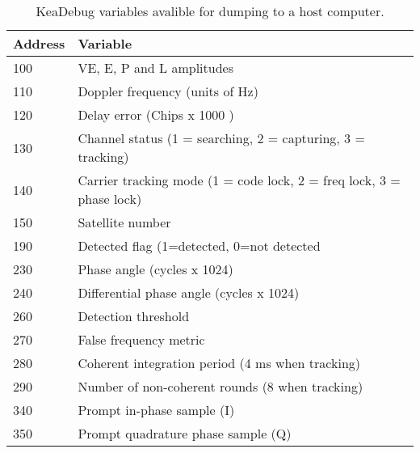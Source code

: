 \begin{table}[!htb]
\centering
\begin{tabular}{|l|l|}
\hline
\rowcolor[HTML]{C0C0C0} 
Address & Variable                                                             \\ \hline
100     & VE, E, P and L amplitudes                                            \\ \hline
\rowcolor[HTML]{EFEFEF} 
110     & Doppler frequency (units of Hz)                                      \\ \hline
120     & Delay error (Chips x 1000 )                                          \\ \hline
\rowcolor[HTML]{EFEFEF} 
130     & Channel status (1 = searching, 2 = capturing, 3 = tracking)          \\ \hline
140     & Carrier tracking mode (1 = code lock, 2 = freq lock, 3 = phase lock) \\ \hline
\rowcolor[HTML]{EFEFEF} 
150     & Satellite number                                                     \\ \hline
190     & Detected flag (1=detected, 0=not detected                            \\ \hline
\rowcolor[HTML]{EFEFEF} 
230     & Phase angle (cycles x 1024)                                          \\ \hline
240     & Differential phase angle (cycles x 1024)                             \\ \hline
\rowcolor[HTML]{EFEFEF} 
260     & Detection threshold                                                  \\ \hline
270     & False frequency metric                                               \\ \hline
\rowcolor[HTML]{EFEFEF} 
280     & Coherent integration period (4 ms when tracking)                     \\ \hline
290     & Number of non-coherent rounds (8 when tracking)                      \\ \hline
\rowcolor[HTML]{EFEFEF} 
340     & Prompt in-phase sample (I)                                           \\ \hline
350     & Prompt quadrature phase sample (Q)                                   \\ \hline
\end{tabular}
\caption{KeaDebug variables avalible for dumping to a host computer.}
\label{tab:KeaDebugKey}
\end{table}

